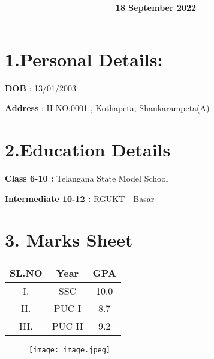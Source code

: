 \documentclass[a4paper,10pt]{article}
\title{\textbf{\huge{\color{red}{Resume}}}}
\author{\textbf{\color{blue}{B191088}}}
\date{\textbf{18 September 2022}}
\begin{document}
\maketitle

\section*{\huge{\textbf{\color{red}1.Personal Details:}}}

\vspace{2mm}

{\Large{{\Large{\textbf{DOB}}} : 13/01/2003}}

\vspace{2mm}

{\Large{{\Large{\textbf{Address}}} : H-NO:0001 , Kothapeta, Shankarampeta(A)}}

\section*{\textbf{\huge{\color{red}2.Education Details}}}

\vspace{5mm}


\vspace{2mm}

{\textbf{\Large{Class 6-10 :}} \Large{Telangana State Model School}}

\vspace{2mm}

{\textbf{\Large{Intermediate 10-12 :}} \Large{RGUKT - Basar}}

\section*{\textbf{\huge{\color{red}3. Marks Sheet}}}

\begin{table}[h]
\centering
\begin{tabular}{|c|c|c|}
\hline
\textbf{SL.NO} & \textbf{Year} & \textbf{GPA}\\
\hline
I. & SSC & 10.0\\
\hline
II. & PUC I & 8.7\\
\hline
III. & PUC II & 9.2\\
\hline

\end{tabular}

\end{table}

\begin{figure}[h]
 \centering
 \texttt{[image: image.jpeg]}
\end{figure}
\end{document}
